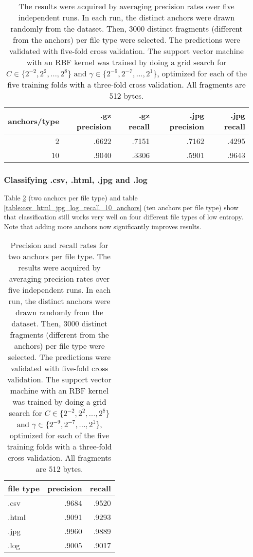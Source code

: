 \begin{table}[h]
\begin{tabular}{rrrrr}
\hline
   anchors/type &   .gz precision &   .gz recall &   .jpg precision &   .jpg recall \\
\hline
              2 &           .6622 &           .7151 &    .7162 &    .4295 \\
             10 &           .9040 &           .3306 &    .5901 &    .9643 \\
\hline
\end{tabular}
\caption{
The results were acquired by averaging precision rates over five
independent runs. In each run, the distinct anchors were drawn randomly from the dataset.
Then, 3000 distinct fragments (different from the anchors) per file type were selected.
The predictions were validated with five-fold cross validation.
The support vector machine with an RBF kernel was trained by doing a grid search
for $C \in \{ 2^{-2}, 2^{2}, \dots, 2^{8} \}$ and $\gamma \in \{2^{-9},
2^{-7}, \dots, 2^{1} \}$, optimized for each of the five training folds with a three-fold
cross validation. All fragments are 512 bytes.} \label{table:gz_jpg_recall}
\end{table}

\subsubsection{Classifying .csv, .html, .jpg and .log}

Table \ref{table:csv_html_jpg_log_recall} (two anchors per file type) and table \ref{table:csv_html_jpg_log_recall_10_anchors} (ten anchors per file type) show that classification still
works very well on four different file types of low entropy. Note that
adding more anchors now significantly improves results.

\begin{table}[h]
  \begin{tabular}{lrr}
  \hline
   file type   &   precision &   recall \\
  \hline
   .csv        &      .9684 &   .9520 \\
   .html       &      .9091 &   .9293 \\
   .jpg        &      .9960 &   .9889 \\
   .log        &      .9005 &   .9017 \\
  \hline
  \end{tabular}
\caption{
Precision and recall rates for two anchors per file type. The results were acquired by averaging precision rates over five
independent runs. In each run, the distinct anchors were drawn randomly from the dataset.
Then, 3000 distinct fragments (different from the anchors) per file type were selected.
The predictions were validated with five-fold cross validation.
The support vector machine with an RBF kernel was trained by doing a grid search
for $C \in \{ 2^{-2}, 2^{2}, \dots, 2^{8} \}$ and $\gamma \in \{2^{-9},
2^{-7}, \dots, 2^{1} \}$, optimized for each of the five training folds with a three-fold
cross validation. All fragments are 512 bytes.}
\label{table:csv_html_jpg_log_recall}
\end{table}

